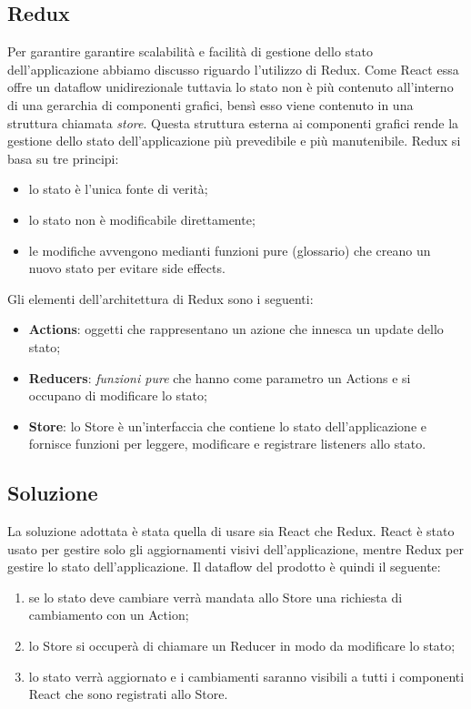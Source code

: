 \subsection{Redux}
Per garantire garantire scalabilità e facilità di gestione dello stato dell'applicazione abbiamo discusso riguardo l'utilizzo di Redux. Come React essa offre un dataflow unidirezionale tuttavia lo stato non è più contenuto all'interno di una gerarchia di componenti grafici, bensì esso viene contenuto in una struttura chiamata \emph{store}. Questa struttura esterna ai componenti grafici rende la gestione dello stato dell'applicazione più prevedibile e più manutenibile. Redux si basa su tre principi:
\begin{itemize}
	\item lo stato è l'unica fonte di verità;
	\item lo stato non è modificabile direttamente;
	\item le modifiche avvengono medianti funzioni pure (glossario) che creano un nuovo stato per evitare side effects.
\end{itemize}
\noindent
Gli elementi dell'architettura di Redux sono i seguenti:
\begin{itemize}
	\item \textbf{Actions}: oggetti che rappresentano un azione che innesca un update dello stato;
	\item \textbf{Reducers}: \emph{funzioni pure} che hanno come parametro un Actions e si occupano di modificare lo stato;
	\item \textbf{Store}: lo Store è un'interfaccia che contiene lo stato dell'applicazione e fornisce funzioni per leggere, modificare e registrare listeners allo stato.
\end{itemize}
\noindent

\subsection{Soluzione}
La soluzione adottata è stata quella di usare sia React che Redux. React è stato usato per gestire solo gli aggiornamenti visivi dell'applicazione, mentre Redux per gestire lo stato dell'applicazione. Il dataflow del prodotto è quindi il seguente:
\begin{enumerate}
	\item se lo stato deve cambiare verrà mandata allo Store una richiesta di cambiamento con un Action;
	\item lo Store si occuperà di chiamare un Reducer in modo da modificare lo stato;
	\item lo stato verrà aggiornato e i cambiamenti saranno visibili a tutti i componenti React che sono registrati allo Store.
\end{enumerate}
